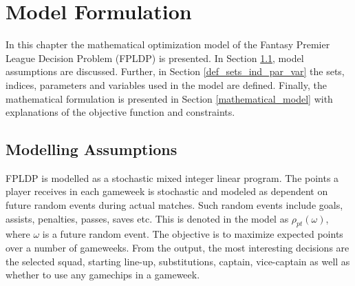 
\chapter{Model Formulation} \label{chapter_model_formulation}

In this chapter the mathematical optimization model of the Fantasy Premier League Decision Problem (FPLDP) is presented. In Section \ref{modelling_choices},  model assumptions are discussed. Further, in Section \ref{def_sets_ind_par_var} the sets, indices, parameters and variables used in the model are defined. Finally, the mathematical formulation is presented in Section \ref{mathematical_model} with explanations of the objective function and constraints. 


\section{Modelling Assumptions} \label{modelling_choices}

\begin{comment}
As mentioned in Section \ref{Other_Relevant_Research}, the FPLDP resembles the classic Knapsack problem. In the Knapsack problem, there is a range of items with a value and cost, and the goal is to maximize the total value meanwhile not surpass a budget. Whereas in this case there are players where their value is points and their cost is an amount predetermined by the game. The aim is to pick players such as the total amount of points is maximized while the budget is held in each gameweek. In addition, there are constraints that handle the choices of substitutes, captain and vice-captain each gameweek. The decisions on wildcard, bench boost, free hit and triple captain are also modelled. 

\end{comment}


\newpar

FPLDP is modelled as a stochastic mixed integer linear program. The points a player receives in each gameweek is stochastic and modeled as dependent on future random events during actual matches. Such random events include goals, assists, penalties, passes, saves etc. This is denoted in the model as $\rho_{pt}(\omega)$, where $\omega$ is a future random event. The objective is to maximize expected points over a number of gameweeks. From the output, the most interesting decisions are the selected squad, starting line-up, substitutions, captain, vice-captain as well as whether to use any gamechips in a gameweek. 

